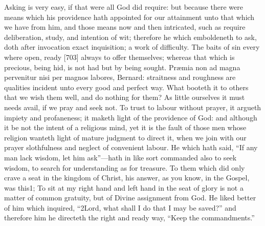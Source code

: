 Asking is very easy, if that were all God did require: but because there were means which his providence hath appointed for our attainment unto that which we have from him, and those means now and then intricated, such as require deliberation, study, and intention of wit; therefore he which emboldeneth to ask, doth after invocation exact inquisition; a work of difficulty. The baits of sin every where open, ready [703] always to offer themselves; whereas that which is precious, being hid, is not had but by being sought. Præmia non ad magna pervenitur nisi per magnos labores, Bernard: straitness and roughness are qualities incident unto every good and perfect way. What booteth it to others that we wish them well, and do nothing for them? As little ourselves it must needs avail, if we pray and seek not. To trust to labour without prayer, it argueth impiety and profaneness; it maketh light of the providence of God: and although it be not the intent of a religious mind, yet it is the fault of those men whose religion wanteth light of mature judgment to direct it, when we join with our prayer slothfulness and neglect of convenient labour. He which hath said, “If any man lack wisdom, let him ask”—hath in like sort commanded also to seek wisdom, to search for understanding as for treasure. To them which did only crave a seat in the kingdom of Christ, his answer, as you know, in the Gospel, was this1; To sit at my right hand and left hand in the seat of glory is not a matter of common gratuity, but of Divine assignment from God. He liked better of him which inquired, “2Lord, what shall I do that I may be saved?” and therefore him he directeth the right and ready way, “Keep the commandments.”

